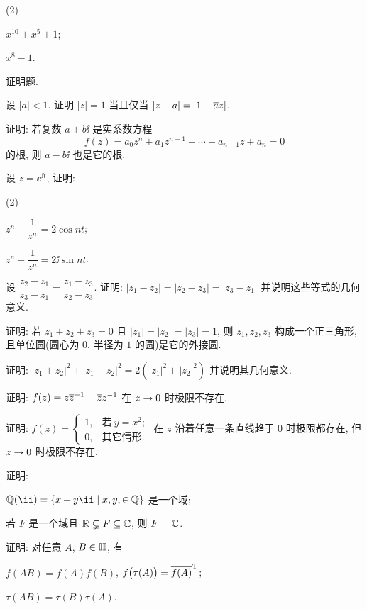 \begin{homework}
\begin{homework}
      \begin{subhomework}(2)
        \item $x^{10}+x^5+1$;
        \item $x^8-1$.
      \end{subhomework}
  \end{homework}
  \item 证明题.
  \begin{homework}
    \item 设 $|a|<1$. 证明 $|z|=1$ 当且仅当 $|z-a|=|1-\overline az|$.
    \item 证明: 若复数 $a+b\ii$ 是实系数方程
      \[
        f(z)=a_0z^n+a_1z^{n-1}+\cdots+a_{n-1}z+a_n=0
      \]
      的根, 则 $a-b\ii$ 也是它的根.
    \item 设 $z=\ee^{\ii t}$, 证明:
    \begin{subhomework}(2)
      \item $z^n+\dfrac1{z^n}=2\cos{nt}$;
      \item $z^n-\dfrac1{z^n}=2\ii\sin{nt}$.
    \end{subhomework}
    \item 设 $\dfrac{z_2-z_1}{z_3-z_1}=\dfrac{z_1-z_3}{z_2-z_3}$. 证明: $|z_1-z_2|=|z_2-z_3|=|z_3-z_1|$ 并说明这些等式的几何意义.
    \item 证明: 若 $z_1+z_2+z_3=0$ 且 $|z_1|=|z_2|=|z_3|=1$, 则 $z_1,z_2,z_3$ 构成一个正三角形, 且单位圆(圆心为 $0$, 半径为 $1$ 的圆)是它的外接圆.
    \item 证明: $|z_1+z_2|^2+|z_1-z_2|^2=2(|z_1|^2+|z_2|^2)$ 并说明其几何意义.
    \item 证明: $f(z)=z{\overline z}^{-1}-\overline zz^{-1}$ 在 $z\rightarrow 0$ 时极限不存在.
    \item 证明: $f(z)=\begin{cases}
      1,&\text{若}\ y=x^2;\\
      0,&\text{其它情形}.
    \end{cases}$ 在 $z$ 沿着任意一条直线趋于 $0$ 时极限都存在, 但 $z\rightarrow0$ 时极限不存在.
    \item \optionalex 证明: 
      \begin{subhomework}
        \item $\BQ(\ii)=\{x+y\ii\mid x,y,\in\BQ\}$ 是一个域;
        \item 若 $F$ 是一个域且 ${\mathbb{R}}\subsetneq F\subseteq {\mathbb{C}}$, 则 $F={\mathbb{C}}$.
      \end{subhomework}
    \item \optionalex 证明: 对任意 $A$, $B\in{\mathbb{H}}$, 有
    \begin{enumr}
      \item $f(AB)=f(A)f(B)$, $f\bigl(\tau(A)\bigr)=\overline{f(A)}^{{\mathrm{T}}}$;
      \item $\tau(AB)=\tau(B)\tau(A)$.
    \end{enumr}
  \end{homework}
\end{homework}


